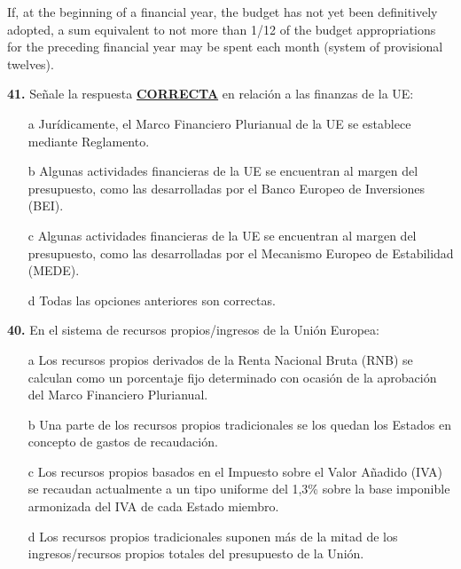 \documentclass{nuevotema}
\begin{document}
If, at the beginning of a financial year, the budget has not yet been definitively adopted, a sum equivalent to not more than 1/12 of the budget appropriations for the preceding financial year may be spent each month (system of provisional twelves).

\preguntas


\textbf{41.} Señale la respuesta \textbf{\underline{CORRECTA}} en relación a las finanzas de la UE:

\begin{itemize}
	\item[a] Jurídicamente, el Marco Financiero Plurianual de la UE se establece mediante Reglamento.
	\item[b] Algunas actividades financieras de la UE se encuentran al margen del presupuesto, como las desarrolladas por el Banco Europeo de Inversiones (BEI).
	\item[c] Algunas actividades financieras de la UE se encuentran al margen del presupuesto, como las desarrolladas por el Mecanismo Europeo de Estabilidad (MEDE).
	\item[d] Todas las opciones anteriores son correctas.
\end{itemize}


\textbf{40.} En el sistema de recursos propios/ingresos de la Unión Europea:

\begin{itemize}
	\item[a] Los recursos propios derivados de la Renta Nacional Bruta (RNB) se calculan como un porcentaje fijo determinado con ocasión de la aprobación del Marco Financiero Plurianual.
	\item[b] Una parte de los recursos propios tradicionales se los quedan los Estados en concepto de gastos de recaudación.
	\item[c] Los recursos propios basados en el Impuesto sobre el Valor Añadido (IVA) se recaudan actualmente a un tipo uniforme del 1,3\% sobre la base imponible armonizada del IVA de cada Estado miembro.
	\item[d] Los recursos propios tradicionales suponen más de la mitad de los ingresos/recursos propios totales del presupuesto de la Unión.
\end{itemize}
\end{document}
